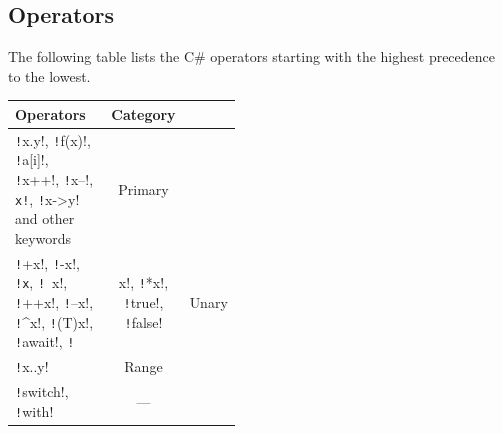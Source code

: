 \documentclass{article}
\begin{document}
\subsection{Operators}
The following table lists the C\# operators starting with the highest
precedence to the lowest.
\begin{table}[H]
    \centering
    \begin{tabular}
        {>{\centering}p{0.45\linewidth} c}
        \toprule
        \textbf{Operators}                                                                                                                                                 & \textbf{Category}                                                                                                                            \\
        \midrule
        \texttt!x.y!, \texttt!f(x)!, \texttt!a[i]!, \texttt!x++!,
        \texttt!x--!, \texttt{x!}, \texttt!x->y! and other keywords                                                                    & Primary                                                                                                                                      \\
        \texttt!+x!, \texttt!-x!, \texttt{!x}, \texttt!~x!,
        \texttt!++x!, \texttt!--x!, \texttt!^x!, \texttt!(T)x!, \texttt!await!,
        \texttt!                                                                                                                                               & x!, \texttt!*x!, \texttt!true!, \texttt!false! & Unary                                                   \\
        \texttt!x..y!                                                                                                                                          & Range                                                                                                                                        \\
        \texttt!switch!, \texttt!with!                                                                                                             & ---                                                                                                                                          \\

\end{tabular}
\end{table}
\end{document}
